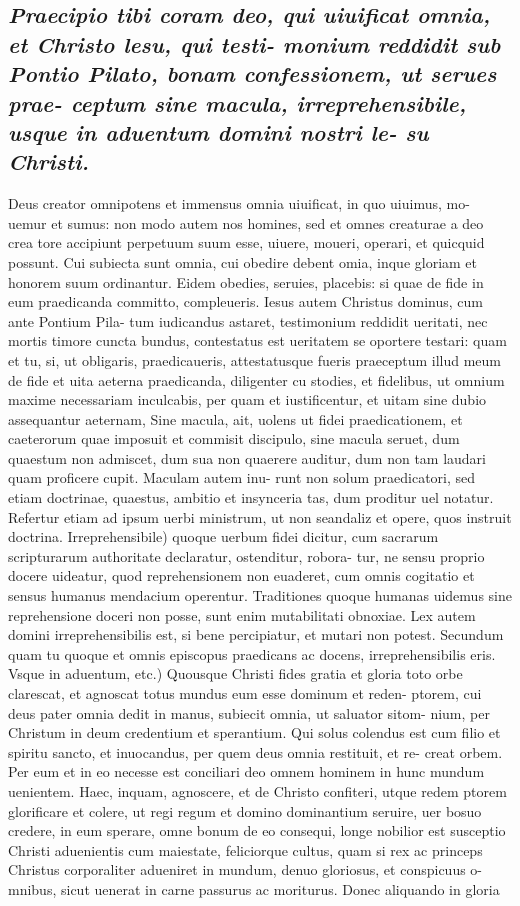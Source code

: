 \documentclass{article}
\begin{document}
\begin{pages}
\subsection*{\textit{Praecipio tibi coram deo, qui uiuificat omnia, et Christo lesu, qui testi- monium reddidit sub Pontio Pilato, bonam confessionem, ut serues prae- ceptum sine macula, irreprehensibile, usque in aduentum domini nostri le- su Christi. }}\pstart Deus creator omnipotens et immensus omnia uiuificat, in quo uiuimus, mo- uemur et sumus: non modo autem nos homines, sed et omnes creaturae a deo crea tore accipiunt perpetuum suum esse, uiuere, moueri, operari, et quicquid possunt. Cui subiecta sunt omnia, cui obedire debent omia, inque gloriam et honorem suum ordinantur. Eidem obedies, seruies, placebis: si quae de fide in eum praedicanda committo, compleueris. Iesus autem Christus dominus, cum ante Pontium Pila- tum iudicandus astaret, testimonium reddidit ueritati, nec mortis timore cuncta bundus, contestatus est ueritatem se oportere testari: quam et tu, si, ut obligaris, praedicaueris, attestatusque fueris praeceptum illud meum de fide et uita aeterna praedicanda, diligenter cu stodies, et fidelibus, ut omnium maxime necessariam inculcabis, per quam et iustificentur, et uitam sine dubio assequantur aeternam, Sine macula, ait, uolens ut fidei praedicationem, et caeterorum quae imposuit et commisit discipulo, sine macula seruet, dum quaestum non admiscet, dum sua non quaerere auditur, dum non tam laudari quam proficere cupit. Maculam autem inu- runt non solum praedicatori, sed etiam doctrinae, quaestus, ambitio et insynceria tas, dum proditur uel notatur. Refertur etiam ad ipsum uerbi ministrum, ut non seandaliz et opere, quos instruit doctrina. Irreprehensibile) quoque uerbum fidei dicitur, cum sacrarum scripturarum authoritate declaratur, ostenditur, robora- tur, ne sensu proprio docere uideatur, quod reprehensionem non euaderet, cum omnis cogitatio et sensus humanus mendacium operentur. Traditiones quoque  humanas uidemus sine reprehensione doceri non posse, sunt enim mutabilitati obnoxiae. Lex autem domini irreprehensibilis est, si bene percipiatur, et mutari non potest. Secundum quam tu quoque et omnis episcopus praedicans ac docens, irreprehensibilis eris. Vsque in aduentum, etc.) Quousque Christi fides gratia et gloria toto orbe clarescat, et agnoscat totus mundus eum esse dominum et reden- ptorem, cui deus pater omnia dedit in manus, subiecit omnia, ut saluator sitom- nium, per Christum in deum credentium et sperantium. Qui solus colendus est cum filio et spiritu sancto, et inuocandus, per quem deus omnia restituit, et re- creat orbem. Per eum et in eo necesse est conciliari deo omnem hominem in hunc mundum uenientem. Haec, inquam, agnoscere, et de Christo confiteri, utque redem ptorem glorificare et colere, ut regi regum et domino dominantium seruire, uer bosuo credere, in eum sperare, omne bonum de eo consequi, longe nobilior est susceptio Christi aduenientis cum maiestate, feliciorque cultus, quam si rex ac princeps Christus corporaliter adueniret in mundum, denuo gloriosus, et conspicuus o- mnibus, sicut uenerat in carne passurus ac moriturus. Donec aliquando in gloria  \pend

\end{pages}
\end{document}

